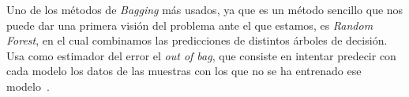 Uno de los métodos de \textit{Bagging} más usados, ya que es un método sencillo que nos puede dar una primera visión del problema ante el que estamos, es \textit{Random Forest}, en el cual combinamos las predicciones de distintos árboles de decisión. Usa como estimador del error el \textit{out of bag}, que consiste en intentar predecir con cada modelo los datos de las muestras con los que no se ha entrenado ese modelo~\cite{mdrf}.